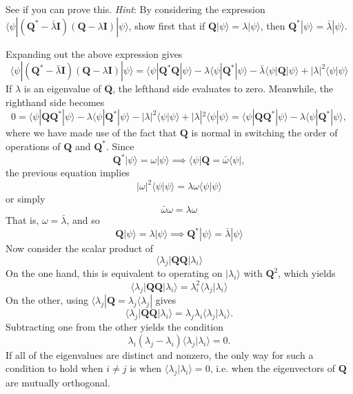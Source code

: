 \documentclass[../road-to-reality.tex]{subfiles}
\begin{document}
\begin{questions}
\question See if you can prove this. \textit{Hint}: By considering the expression $\langle\psi|(\mathbf{Q}^* - \bar{\lambda}\mathbf{I})(\mathbf{Q} - \lambda\mathbf{I})|\psi\rangle$, show first that if $\mathbf{Q}|\psi\rangle = \lambda|\psi\rangle$, then $\mathbf{Q}^*|\psi\rangle = \bar{\lambda}|\psi\rangle$.

\begin{solution}
	Expanding out the above expression gives
	\[
	\langle\psi|(\mathbf{Q}^* - \bar{\lambda}\mathbf{I})(\mathbf{Q} - \lambda\mathbf{I})|\psi\rangle = \langle\psi|\mathbf{Q}^*\mathbf{Q}|\psi\rangle - \lambda\langle\psi|\mathbf{Q}^*|\psi\rangle - \bar{\lambda}\langle\psi|\mathbf{Q}|\psi\rangle + |\lambda|^2\langle\psi|\psi\rangle
	\]
	If $\lambda$ is an eigenvalue of $\mathbf{Q}$, the lefthand side evaluates to zero. Meanwhile, the righthand side becomes
	\[
		0 = \langle\psi|\mathbf{Q}\mathbf{Q}^*|\psi\rangle - \lambda\langle\psi|\mathbf{Q}^*|\psi\rangle - |\lambda|^2\langle\psi|\psi\rangle + |\lambda|^2\langle\psi|\psi\rangle = \langle\psi|\mathbf{Q}\mathbf{Q}^*|\psi\rangle - \lambda\langle\psi|\mathbf{Q}^*|\psi\rangle,
	\]
	where we have made use of the fact that $\mathbf{Q}$ is normal in switching the order of operations of $\mathbf{Q}$ and $\mathbf{Q}^*$. Since
	\[
		\mathbf{Q}^*|\psi\rangle = \omega|\psi\rangle \implies \langle\psi|\mathbf{Q} = \bar{\omega}\langle\psi|,
	\]
	the previous equation implies
	\[
		|\omega|^2\langle\psi|\psi\rangle = \lambda\omega\langle\psi|\psi\rangle
	\]
	or simply
	\[
		\bar{\omega}\omega = \lambda\omega
	\]
	That is, $\omega = \bar{\lambda}$, and so
	\[
		\mathbf{Q}|\psi\rangle = \lambda|\psi\rangle \implies \mathbf{Q}^*|\psi\rangle = \bar{\lambda}|\psi\rangle
	\]
	Now consider the scalar product of
	\[
		\langle\lambda_j|\mathbf{Q}\mathbf{Q}|\lambda_i\rangle
	\]
	On the one hand, this is equivalent to operating on $|\lambda_i\rangle$ with $\mathbf{Q}^2$, which yields
	\[
		\langle\lambda_j|\mathbf{Q}\mathbf{Q}|\lambda_i\rangle = \lambda_i^2\langle\lambda_j|\lambda_i\rangle
	\]
	On the other, using $\langle\lambda_j|\mathbf{Q} = \lambda_j\langle\lambda_j|$ gives
	\[
		\langle\lambda_j|\mathbf{Q}\mathbf{Q}|\lambda_i\rangle = \lambda_j\lambda_i\langle\lambda_j|\lambda_i\rangle.
	\]
	Subtracting one from the other yields the condition
	\[
		\lambda_i(\lambda_j - \lambda_i)\langle\lambda_j|\lambda_i\rangle=0.
	\]
	If all of the eigenvalues are distinct and nonzero, the only way for such a condition to hold when $i\neq{j}$ is when $\langle\lambda_j|\lambda_i\rangle=0$, i.e. when the eigenvectors of $\mathbf{Q}$ are mutually orthogonal.
\end{solution}


\end{questions}
\end{document}
